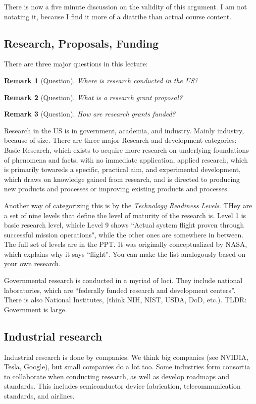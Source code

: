 \documentclass[10pt, oneside]{article}
\newtheorem{rem}{Remark}
\begin{document}
There is now a five minute discussion on the validity of this argument. I am not notating it, because I find it more of a diatribe than actual course content. 
\subsection{Research, Proposals, Funding}
There are three major questions in this lecture:
\begin{rem}[Question]
    Where is research conducted in the US?
\end{rem}
\begin{rem}[Question]
    What is a research grant proposal?
\end{rem}
\begin{rem}[Question]
How are research grants funded?
\end{rem}
Research in the US is in government, academia, and industry. Mainly industry, because of size. 
There are three major Research and development categories: Basic Research, which exists to acquire more research on underlying foundations of phenomena and facts, with no immediate application, applied research, which is primarily towareds a specific, practical aim, and experimental development, which draws on knowledge gained from research, and is directed to producing new products and processes or improving existing products and processes. 

Another way of categorizing this is by the \textit{Technology Readiness Levels}. THey are a set of nine levels that define the level of maturity of the research is. Level 1 is basic research level, whicle Level 9 shows ``Actual system flight proven through successful mission operations", while the other ones are somewhere in between. The full set of levels are in the PPT. It was originally conceptualized by NASA, which explains why it says ``flight". You can make the list analogously based on your own research. 

Governmental research is conducted in a myriad of loci. They include national laboratories, which are ``federally funded research and development centers''. There is also National Institutes, (think NIH, NIST, USDA, DoD, etc.). TLDR: Government is large. 

\subsection{Industrial research}
Industrial research is done by companies. We think big companies (see NVIDIA, Tesla, Google), but small companies do a lot too. Some industries form consortia to collaborate when conducting research, as well as develop roadmaps and standards. This includes semiconductor device fabrication, telecommunication standards, and airlines. 
\end{document}
